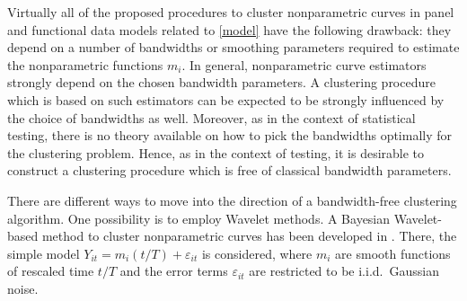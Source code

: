 \documentclass[a4paper,12pt]{article}
\begin{document}
Virtually all of the proposed procedures to cluster nonparametric curves in panel and functional data models related to \eqref{model} have the following drawback: they depend on a number of bandwidths or smoothing parameters required to estimate the nonparametric functions $m_i$. 
In general, nonparametric curve estimators strongly depend on the chosen bandwidth parameters. A clustering procedure which is based on such estimators can be expected to be strongly influenced by the choice of bandwidths as well. Moreover, as in the context of statistical testing, there is no theory available on how to pick the bandwidths optimally for the clustering problem. Hence, as in the context of testing, it is desirable to construct a clustering procedure which is free of classical bandwidth parameters. 


There are different ways to move into the direction of a bandwidth-free clustering algorithm. One possibility is to employ Wavelet methods. A Bayesian Wavelet-based method to cluster nonparametric curves has been developed in \cite{Ray2006}. There, the simple model $Y_{it} = m_i(t/T) + \varepsilon_{it}$ is considered, where $m_i$ are smooth functions of rescaled time $t/T$ and the error terms $\varepsilon_{it}$ are restricted to be i.i.d.\ Gaussian noise. 
\end{document}
